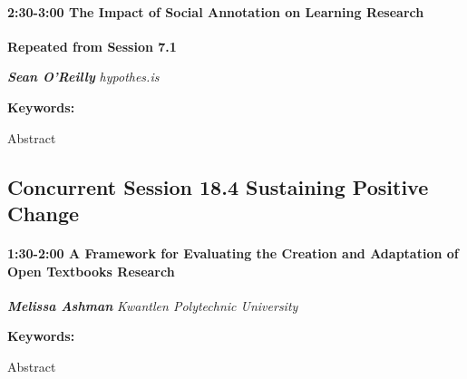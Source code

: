 \documentclass[
]{book}
\begin{document}
\begin{vendor}
\hypertarget{the-impact-of-social-annotation-on-learning-research}{%
\paragraph*{\texorpdfstring{2:30-3:00 \textbar{} \textbf{The Impact of
Social Annotation on Learning} \textbar{}
Research}{2:30-3:00 \textbar{} The Impact of Social Annotation on Learning \textbar{} Research}}\label{the-impact-of-social-annotation-on-learning-research}}

\textbf{Repeated from Session 7.1}

\textbf{\emph{Sean O'Reilly}} \textbar{} \emph{hypothes.is}

\textbf{Keywords:}

Abstract
\end{vendor}

\hypertarget{concurrent-session-18.4-sustaining-positive-change}{%
\subsection*{Concurrent Session 18.4 \textbar{} Sustaining Positive Change}\label{concurrent-session-18.4-sustaining-positive-change}}

\begin{session}
\hypertarget{a-framework-for-evaluating-the-creation-and-adaptation-of-open-textbooks-research}{%
\paragraph*{\texorpdfstring{1:30-2:00 \textbar{} \textbf{A Framework for
Evaluating the Creation and Adaptation of Open Textbooks} \textbar{}
Research}{1:30-2:00 \textbar{} A Framework for Evaluating the Creation and Adaptation of Open Textbooks \textbar{} Research}}\label{a-framework-for-evaluating-the-creation-and-adaptation-of-open-textbooks-research}}

\textbf{\emph{Melissa Ashman}} \textbar{} \emph{Kwantlen Polytechnic
University}

\textbf{Keywords:}

Abstract
\end{session}
\end{document}
